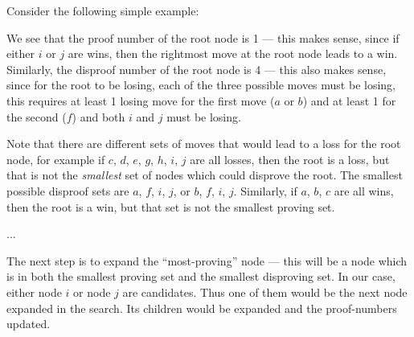 \documentclass[10pt,dvipdfmx,letterpaper]{report}
\begin{document}
Consider the following simple example:
\iffalse
\begin{center}
\begin{tikzpicture}%
  \tikzstyle{level 1}=[level distance=20mm,sibling distance=50mm]
  \tikzstyle{level 2}=[level distance=20mm,sibling distance=20mm]
  \tikzstyle{level 3}=[level distance=20mm,sibling distance=10mm]
  \tikzstyle{boxn}=[rectangle,draw=red,inner sep=2]
  \tikzstyle{cirn}=[circle,draw=blue,inner sep=1]
  \node(0)[boxn]{$\frac14$}
    child{node[cirn]{$\frac31$}
      child{node[boxn]{$\frac11$} child{node{a}}}
      child{node[boxn]{$\frac11$} child{node{b}}}
      child{node[boxn]{$\frac13$} child{node{c}} child{node{d}} child{node{e}}}}
    child{node[cirn]{$\frac21$}
      child{node[boxn]{$\frac11$} child{node{f}}}
      child{node[boxn]{$\frac12$} child{node{g}} child{node{h}}}}
    child{node[cirn]{$\frac12$}
      child{node[boxn]{$\frac12$} child{node{i}} child{node{j}}}}
    ;
\end{tikzpicture}
\end{center}
\fi
We see that the proof number of the root node is 1 --- this makes sense, since if
either $i$ or $j$ are wins, then the rightmost move at the root node leads to a win.
Similarly, the disproof number of the root node is 4 --- this also makes sense, since
for the root to be losing, each of the three possible moves must be losing, this requires
at least 1 losing move for the first move ($a$ or $b$) and at least 1 for the second ($f$)
and both $i$ and $j$ must be losing.

Note that there are different sets of moves that would lead to a loss for the root node,
for example if $c$, $d$, $e$, $g$, $h$, $i$, $j$ are all losses, then the root is a loss, but that
is not the {\em smallest} set of nodes which could disprove the root.  The smallest possible disproof
sets are $a$, $f$, $i$, $j$, or $b$, $f$, $i$, $j$.
Similarly, if $a$, $b$, $c$ are all wins, then the root is a win, but that set is not the smallest
proving set.

...

The next step is to expand the ``most-proving'' node --- this will be a node which is in both the
smallest proving set and the smallest disproving set.  In our case, either node $i$ or node $j$ are
candidates.  Thus one of them would be the next node expanded in the search.  Its children would be
expanded and the proof-numbers updated.
\end{document}
